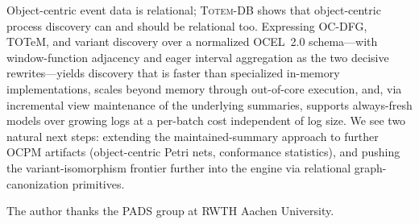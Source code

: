 \documentclass[sigconf, nonacm]{acmart}
\newcommand{\sys}{\textsc{Totem-DB}\xspace}
\newcommand{\ocel}{OCEL~2.0\xspace}
\begin{document}
Object-centric event data is relational; \sys shows that object-centric process discovery can and should be relational too. Expressing OC-DFG, TOTeM, and variant discovery over a normalized \ocel schema---with window-function adjacency and eager interval aggregation as the two decisive rewrites---yields discovery that is faster than specialized in-memory implementations, scales beyond memory through out-of-core execution, and, via incremental view maintenance of the underlying summaries, supports always-fresh models over growing logs at a per-batch cost independent of log size. We see two natural next steps: extending the maintained-summary approach to further OCPM artifacts (object-centric Petri nets, conformance statistics), and pushing the variant-isomorphism frontier further into the engine via relational graph-canonization primitives.

\begin{acks}
The author thanks the PADS group at RWTH Aachen University.
\end{acks}



\end{document}
